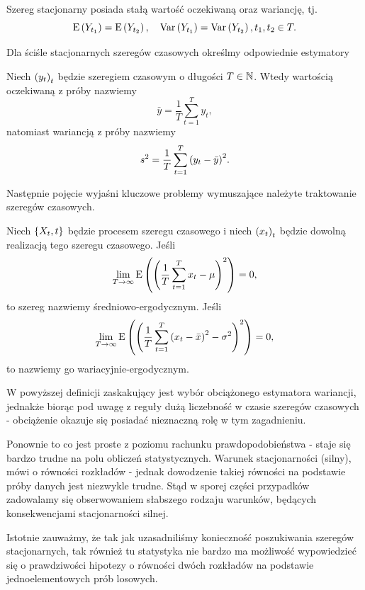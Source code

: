 \documentclass[10pt,a4paper]{book}
\begin{document}
\begin{proposition}
Szereg stacjonarny posiada stałą wartość oczekiwaną oraz wariancję, tj.
$$
\operatorname{E} \left({Y_{t_1}} \right) = \operatorname{E} \left({Y_{t_2}} \right) , \quad \operatorname{Var} \left( {Y_{t_1}} \right) = \operatorname{Var} \left( {Y_{t_2}} \right), t_1, t_2 \in T.
$$
\end{proposition}

Dla ściśle stacjonarnych szeregów czasowych określmy odpowiednie estymatory

\begin{definition}
Niech $\left( {y_t} \right)_{t}^{}$ będzie szeregiem czasowym o długości $T \in \mathbb{N}$. Wtedy wartością oczekiwaną z próby nazwiemy
$$
\bar{y} = \frac{1}{T} \sum_{t=1}^{T} y_t,
$$
natomiast wariancją z próby nazwiemy
$$
s^2 = \frac{1}{T} \sum_{t=1}^{T} \bracket{y_t - \bar{y}}^2.
$$
\end{definition}

Następnie pojęcie wyjaśni kluczowe problemy wymuszające należyte traktowanie szeregów czasowych.

\begin{definition}
Niech $\left\lbrace {{X_t}, {t}} \right\rbrace$ będzie procesem szeregu czasowego i niech $\left({x_t}\right)_{t}$ będzie dowolną realizacją tego szeregu czasowego. Jeśli
$$
\lim_{T \to \infty} \Ex{\bracket{ \frac{1}{T} \sum_{t=1}^{T} x_t  - \mu }^2} = 0,
$$  
to szereg nazwiemy średniowo-ergodycznym. Jeśli
$$
\lim_{T \to \infty} \Ex{\bracket{ \frac{1}{T} \sum_{t=1}^{T} \bracket{x_t - \bar{x}}^2  - \sigma^2 }^2} = 0,
$$
to nazwiemy go wariacyjnie-ergodycznym.
\end{definition}

W powyższej definicji zaskakujący jest wybór obciążonego estymatora wariancji, jednakże biorąc pod uwagę z reguły dużą liczebność w czasie szeregów czasowych - obciążenie okazuje się posiadać nieznaczną rolę w tym zagadnieniu.

Ponownie to co jest proste z poziomu rachunku prawdopodobieństwa - staje się bardzo trudne na polu obliczeń statystycznych. Warunek stacjonarności (silny), mówi o równości rozkładów - jednak dowodzenie takiej równości na podstawie próby danych jest niezwykle trudne. Stąd w sporej części przypadków zadowalamy się obserwowaniem słabszego rodzaju warunków, będących konsekwencjami stacjonarności silnej.

\begin{remark*}
Istotnie zauważmy, że tak jak uzasadniliśmy konieczność poszukiwania szeregów stacjonarnych, tak również tu statystyka nie bardzo ma możliwość wypowiedzieć się o prawdziwości hipotezy o równości dwóch rozkładów na podstawie jednoelementowych prób losowych.
\end{remark*}
\end{document}
